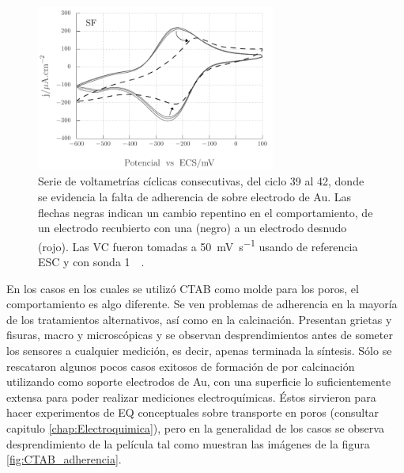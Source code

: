 				\begin{figure}[th]
				 	   	    \begin{center} 
				        	\includegraphics[width=0.70\textwidth]{Graficos/Adherencia_F127.pdf}
				       		\caption[Adherencia de \pdmF \space sobre una película delgada de Au.]{Serie de voltametrías cíclicas consecutivas, del ciclo 39 al 42, donde se evidencia la falta de adherencia de \pdmF\space sobre electrodo de Au. Las flechas negras indican un cambio repentino en el comportamiento, de un electrodo recubierto con una \pdm\space (negro) a un electrodo desnudo (rojo). Las VC fueron tomadas a \SI{50}{\milli\volt.\second^{-1}} usando de referencia ESC y con sonda \ru\space \SI{1}{\milli\Molar}.}
				         	\label{fig:adherencia_F127}
				     		\end{center}
				     		\end{figure}

			En los casos en los cuales se utilizó CTAB como molde para los poros, el comportamiento es algo diferente. Se ven problemas de adherencia en la mayoría de los tratamientos alternativos, así como en la calcinación. Presentan grietas y fisuras, macro y microscópicas y se observan desprendimientos antes de someter los sensores a cualquier medición, es decir, apenas terminada la síntesis. Sólo se rescataron algunos pocos casos exitosos de formación de \pdmC\space por calcinación utilizando como soporte electrodos de Au, con una superficie lo suficientemente extensa para poder realizar mediciones electroquímicas. Éstos sirvieron para hacer experimentos de EQ conceptuales sobre transporte en poros (consultar capitulo \ref{chap:Electroquimica}), pero en la generalidad de los casos se observa desprendimiento de la película tal como muestran las imágenes de la figura \ref{fig:CTAB_adherencia}.

